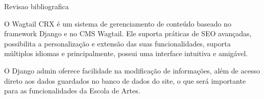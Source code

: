 \begin{frame}{Revisao bibliografica}

O Wagtail CRX é um sistema de gerenciamento de conteúdo baseado no framework Django e no CMS Wagtail. Ele suporta práticas de SEO avançadas, possibilita a personalização e extensão das suas funcionalidades, suporta múltiplos idiomas e principalmente, possui uma interface intuitiva e amigável.

\vspace{\baselineskip}

O Django admin oferece facilidade na modificação de informações, além de acesso direto aos dados
guardados no banco de dados do site, o que será importante para as funcionalidades da Escola de Artes.


\vspace{\baselineskip}

\end{frame}
